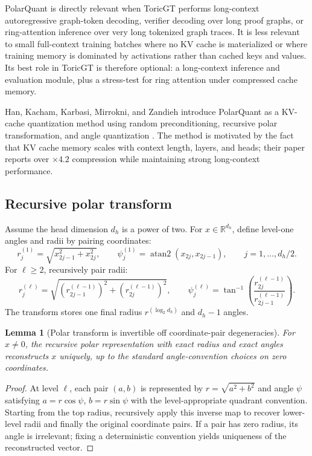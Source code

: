 \documentclass[11pt]{article}
\theoremstyle{definition}
\theoremstyle{plain}
\newtheorem{lemma}[definition]{Lemma}
\theoremstyle{remark}
\numberwithin{equation}{section}
\newcommand{\R}{\mathbb{R}}
\begin{document}
PolarQuant is directly relevant when ToricGT performs long-context autoregressive graph-token decoding, verifier decoding over long proof graphs, or ring-attention inference over very long tokenized graph traces.  It is less relevant to small full-context training batches where no KV cache is materialized or where training memory is dominated by activations rather than cached keys and values.  Its best role in ToricGT is therefore optional: a long-context inference and evaluation module, plus a stress-test for ring attention under compressed cache memory.

Han, Kacham, Karbasi, Mirrokni, and Zandieh introduce PolarQuant as a KV-cache quantization method using random preconditioning, recursive polar transformation, and angle quantization \cite{han2025polarquant}.  The method is motivated by the fact that KV cache memory scales with context length, layers, and heads; their paper reports over $\times 4.2$ compression while maintaining strong long-context performance.

\subsection{Recursive polar transform}

Assume the head dimension $d_h$ is a power of two.  For $x\in\R^{d_h}$, define level-one angles and radii by pairing coordinates:
\begin{equation}
  r_j^{(1)}=\sqrt{x_{2j-1}^2+x_{2j}^2},\qquad
  \psi_j^{(1)}=\operatorname{atan2}(x_{2j},x_{2j-1}),
  \qquad j=1,\ldots,d_h/2.
\end{equation}
For $\ell\ge2$, recursively pair radii:
\begin{equation}
  r_j^{(\ell)}=\sqrt{(r_{2j-1}^{(\ell-1)})^2+(r_{2j}^{(\ell-1)})^2},\qquad
  \psi_j^{(\ell)}=\tan^{-1}\left(\frac{r_{2j}^{(\ell-1)}}{r_{2j-1}^{(\ell-1)}}\right).
\end{equation}
The transform stores one final radius $r^{(\log_2 d_h)}$ and $d_h-1$ angles.

\begin{lemma}[Polar transform is invertible off coordinate-pair degeneracies]
For $x\ne0$, the recursive polar representation with exact radius and exact angles reconstructs $x$ uniquely, up to the standard angle-convention choices on zero coordinates.
\end{lemma}

\begin{proof}
At level $\ell$, each pair $(a,b)$ is represented by $r=\sqrt{a^2+b^2}$ and angle $\psi$ satisfying $a=r\cos\psi$, $b=r\sin\psi$ with the level-appropriate quadrant convention.  Starting from the top radius, recursively apply this inverse map to recover lower-level radii and finally the original coordinate pairs.  If a pair has zero radius, its angle is irrelevant; fixing a deterministic convention yields uniqueness of the reconstructed vector.
\end{proof}
\end{document}
